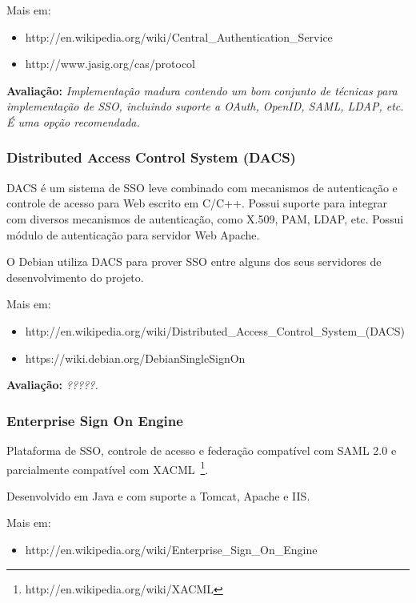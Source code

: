 \documentclass[11pt]{article}
\begin{document}

Mais em:
\begin{itemize}
  \item{http://en.wikipedia.org/wiki/Central\_Authentication\_Service}
  \item{http://www.jasig.org/cas/protocol}
\end{itemize}

{\bf Avaliação:} {\it Implementação madura contendo um bom conjunto de
técnicas para implementação de SSO, incluindo suporte a OAuth, OpenID, SAML, LDAP,
etc. É uma opção recomendada.}

\subsubsection{Distributed Access Control System (DACS)}

DACS é um sistema de SSO leve combinado com mecanismos de autenticação e
controle de acesso para Web escrito em C/C++. Possui suporte para integrar com
diversos mecanismos de autenticação, como X.509, PAM, LDAP, etc. Possui módulo
de autenticação para servidor Web Apache.


O Debian utiliza DACS para prover SSO entre alguns dos seus servidores de
desenvolvimento do projeto.

Mais em:
\begin{itemize}
  \item{http://en.wikipedia.org/wiki/Distributed\_Access\_Control\_System\_(DACS)}
  \item{https://wiki.debian.org/DebianSingleSignOn}
\end{itemize}

{\bf Avaliação:} {\it ?????.}

\subsubsection{Enterprise Sign On Engine}

Plataforma de SSO, controle de acesso e federação compatível com SAML 2.0
e parcialmente compatível com
XACML~\footnote{http://en.wikipedia.org/wiki/XACML}.

Desenvolvido em Java e com suporte a Tomcat, Apache e IIS.

Mais em:
\begin{itemize}
  \item{http://en.wikipedia.org/wiki/Enterprise\_Sign\_On\_Engine}
\end{itemize}
\end{document}

